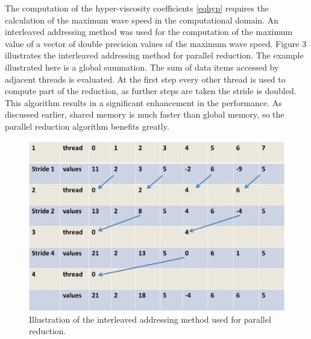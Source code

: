 The computation of the hyper-viscosity coefficients \eqref{eqhyp} requires the calculation of the maximum wave speed in the computational domain. An interleaved addressing method was used for the computation of the maximum value of a vector of double precision values of the maximum wave speed. Figure 3 illustrates the interleaved addressing method for parallel reduction. The example illustrated here is a global summation. The sum of data items accessed by adjacent threads is evaluated. At the first step every other thread is used to compute part of the reduction, as further steps are taken the stride is doubled. This algorithm results in a significant enhancement in the performance.  As discussed earlier, shared memory is much faster than global memory, so the parallel reduction algorithm benefits greatly.\\




\begin{figure}[h]
\includegraphics[scale=0.5]{figure3.jpg}
\caption{Illustration of the interleaved addressing method used for parallel reduction.}
\end{figure}


